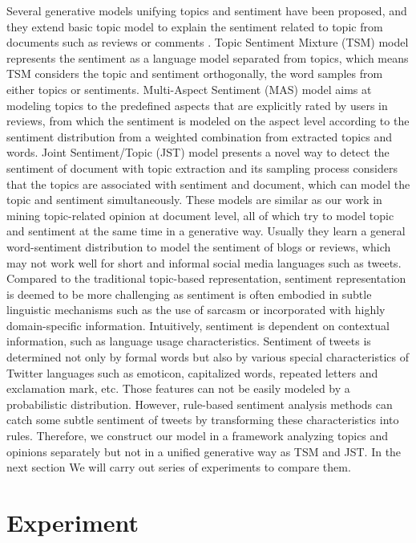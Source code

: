 \documentclass[runningheads,a4paper]{llncs}
\begin{document}
Several generative models unifying topics and sentiment have been proposed, and they extend basic topic model to explain the sentiment related to topic from documents such as reviews or comments \cite{mei2007topic,lin2009joint,zhao2012user}. Topic Sentiment Mixture (TSM) model \cite{mei2007topic} represents the sentiment as a language model separated from topics, which means TSM considers the topic and sentiment orthogonally, the word samples from either topics or sentiments. Multi-Aspect Sentiment (MAS) model \cite{zhao2012user} aims at modeling topics to the predefined aspects that are explicitly rated by users in reviews, from which the sentiment is modeled on the aspect level according to the sentiment distribution from a weighted combination from extracted topics and words. Joint Sentiment/Topic (JST) model \cite{lin2009joint} presents a novel way to detect the sentiment of document with topic extraction and its sampling process considers that the topics are associated with sentiment and document, which can model the topic and sentiment simultaneously. These models are similar as our work in mining topic-related opinion at document level, all of which try to model topic and sentiment at the same time in a generative way. Usually they learn a general word-sentiment distribution to model the sentiment of blogs or reviews, which may not work well for short and informal social media languages such as tweets. Compared to the traditional topic-based representation, sentiment representation is deemed to be more challenging as sentiment is often embodied in subtle linguistic mechanisms such as the use of sarcasm or incorporated with highly domain-specific information. Intuitively, sentiment is dependent on contextual information, such as language usage characteristics. Sentiment of tweets is determined not only by formal words but also by various special characteristics of Twitter languages such as emoticon, capitalized words, repeated letters and exclamation mark, etc. Those features can not be easily modeled by a probabilistic distribution.  However, rule-based sentiment analysis methods can catch some subtle sentiment of tweets by transforming these characteristics into rules. Therefore, we construct our model in a framework analyzing topics and opinions separately but not in a unified generative way as TSM and JST. In the next section We will carry out series of experiments to compare them.

\section{Experiment}
\label{sec5}
\end{document}
